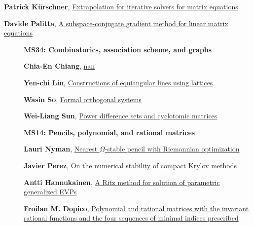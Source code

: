 \documentclass[ILAS2025-program.tex]{subfiles}
\begin{document}
\begin{description}
\begin{description}
{}
        \item[\info{14:30\textrm{--}15:00}] \hypertarget{up0321}{}\textbf{Patrick Kürschner}, \hyperlink{down0321}{Extrapolation for iterative solvers for matrix equations
}
        \item[\info{15:00\textrm{--}15:30}] \hypertarget{up0322}{}\textbf{Davide Palitta}, \hyperlink{down0322}{A subspace-conjugate gradient method for linear matrix equations
}
        \end{description}
    \begin{description}
    \item[] {\color{mstitle}\textbf{MS34: Combinatorics, association scheme, and graphs}} 
    \item[] \hypertarget{up0323}{}\textbf{Chia-En Chiang}, \hyperlink{down0323}{nan}
        \item[] \hypertarget{up0324}{}\textbf{Yen-chi Lin}, \hyperlink{down0324}{Constructions of equiangular lines using lattices
}
        \item[] \hypertarget{up0325}{}\textbf{Wasin So}, \hyperlink{down0325}{Formal orthogonal systems}
        \item[] \hypertarget{up0326}{}\textbf{Wei-Liang Sun}, \hyperlink{down0326}{Power difference sets and cyclotomic matrices}
        \end{description}
    \begin{description}
    \item[] {\color{mstitle}\textbf{MS14: Pencils, polynomial, and rational matrices}} 
    \item[] \hypertarget{up0327}{}\textbf{Lauri Nyman}, \hyperlink{down0327}{Nearest $\Omega$-stable pencil with Riemannian optimization}
        \item[] \hypertarget{up0328}{}\textbf{Javier Perez}, \hyperlink{down0328}{On the numerical stability of compact Krylov methods}
        \item[] \hypertarget{up0329}{}\textbf{Antti Hannukainen}, \hyperlink{down0329}{A Ritz method for solution of parametric generalized EVPs}
        \item[] \hypertarget{up0330}{}\textbf{Froilan M. Dopico}, \hyperlink{down0330}{Polynomial and rational matrices with the invariant rational functions and the four sequences of minimal indices prescribed}

\end{description}
\end{description}
\end{document}
